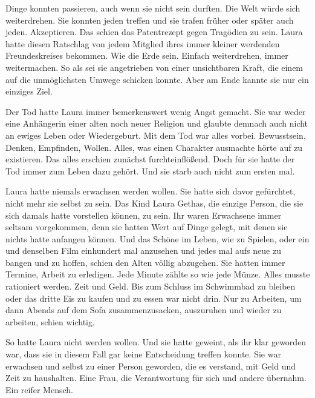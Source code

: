 \par

Dinge konnten passieren, auch wenn sie nicht sein durften. Die Welt würde sich weiterdrehen. Sie konnten jeden treffen und sie trafen früher oder später auch jeden. Akzeptieren. Das schien das Patentrezept gegen Tragödien zu sein. Laura hatte diesen Ratschlag von jedem Mitglied ihres immer kleiner werdenden Freundeskreises bekommen. Wie die Erde sein. Einfach weiterdrehen, immer weitermachen. So als sei sie angetrieben von einer unsichtbaren Kraft, die einem auf die unmöglichsten Umwege schicken konnte. Aber am Ende kannte sie nur ein einziges Ziel.

\par

Der Tod hatte Laura immer bemerkenswert wenig Angst gemacht. Sie war weder eine Anhängerin einer alten noch neuer Religion und glaubte demnach auch nicht an ewiges Leben oder Wiedergeburt. Mit dem Tod war alles vorbei. Bewusstsein, Denken, Empfinden, Wollen. Alles, was einen Charakter ausmachte hörte auf zu existieren. Das alles erschien zunächst furchteinflößend. Doch für sie hatte der Tod immer zum Leben dazu gehört. Und sie starb auch nicht zum ersten mal.

\par

Laura hatte niemals erwachsen werden wollen. Sie hatte sich davor gefürchtet, nicht mehr sie selbst zu sein. Das Kind Laura Gethas, die einzige Person, die sie sich damals hatte vorstellen können, zu sein. Ihr waren Erwachsene immer seltsam vorgekommen, denn sie hatten Wert auf Dinge gelegt, mit denen sie nichts hatte anfangen können. Und das Schöne im Leben, wie zu Spielen, oder ein und denselben Film einhundert mal anzusehen und jedes mal aufs neue zu bangen und zu hoffen, schien den Alten völlig abzugehen. Sie hatten immer Termine, Arbeit zu erledigen. Jede Minute zählte so wie jede Münze. Alles musste rationiert werden. Zeit und Geld. Bis zum Schluss im Schwimmbad zu bleiben oder das dritte Eis zu kaufen und zu essen war nicht drin. Nur zu Arbeiten, um dann Abends auf dem Sofa zusammenzusacken, auszuruhen und wieder zu arbeiten, schien wichtig.

\par

So hatte Laura nicht werden wollen. Und sie hatte geweint, als ihr klar geworden war, dass sie in diesem Fall gar keine Entscheidung treffen konnte. Sie war erwachsen und selbst zu einer Person geworden, die es verstand, mit Geld und Zeit zu haushalten. Eine Frau, die Verantwortung für sich und andere übernahm. Ein reifer Mensch.

